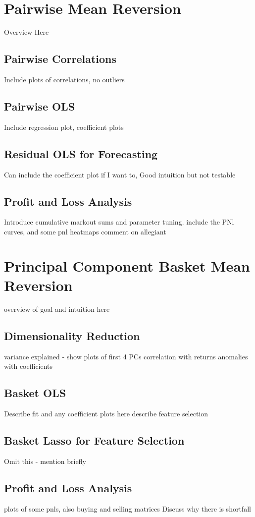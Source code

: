 \documentclass{article}
\begin{document}
\section{Pairwise Mean Reversion}
Overview Here
\subsection{Pairwise Correlations}
Include plots of correlations, no outliers
\subsection{Pairwise OLS}
Include regression plot, coefficient plots
\subsection{Residual OLS for Forecasting}
Can include the coefficient plot if I want to, Good intuition but not testable
\subsection{Profit and Loss Analysis}
Introduce cumulative markout sums and parameter tuning.
include the PNl curves, and some pnl heatmaps
comment on allegiant

\section{Principal Component Basket Mean Reversion}
overview of goal and intuition here
\subsection{Dimensionality Reduction}
variance explained - show plots of first 4 PCs
correlation with returns
anomalies with coefficients
\subsection{Basket OLS}
Describe fit and any coefficient plots here
describe feature selection
\subsection{Basket Lasso for Feature Selection}
Omit this - mention briefly
\subsection{Profit and Loss Analysis}
plots of some pnls, also buying and selling matrices
Discuss why there is shortfall
\end{document}
